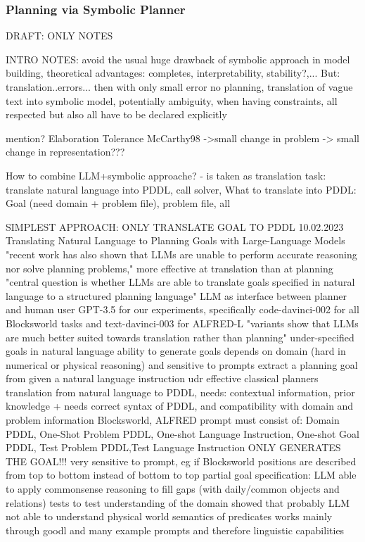 \documentclass{article}
\begin{document}
\subsubsection{Planning via Symbolic Planner}
DRAFT: ONLY NOTES

INTRO NOTES: 
avoid the usual huge drawback of symbolic approach in model building, 
theoretical advantages: completes, interpretability, stability?,...
But: translation..errors... then with only small error no planning, translation of vague text into symbolic model, potentially ambiguity, 
when having constraints, all respected but also all have to be declared explicitly

mention? Elaboration Tolerance McCarthy98 ->small change in problem -> small change in representation???

How to combine LLM+symbolic approache? -  is taken as translation task: translate natural language into PDDL, call solver, 
What to translate into PDDL: Goal (need domain + problem file), problem file, all

SIMPLEST APPROACH: ONLY TRANSLATE GOAL TO PDDL
\cite{xie_translating_2023} 10.02.2023 Translating Natural Language to Planning Goals with Large-Language Models
"recent work has also shown that LLMs are unable to perform accurate reasoning nor solve planning problems,"
more effective at translation than at planning
"central question is whether LLMs are able to translate goals specified in natural language to a structured planning language"
LLM as interface between planner and human user
GPT-3.5 for our experiments, specifically code-davinci-002 for all Blocksworld tasks and text-davinci-003 for ALFRED-L
"variants show that LLMs are much better suited towards translation rather than planning"
under-specified goals in natural language
ability to generate goals depends on domain (hard in numerical or physical reasoning) and sensitive to prompts
extract a planning goal from given a natural language instruction
udr effective classical planners
translation from natural language to PDDL, needs: contextual information, prior knowledge
+ needs correct syntax of PDDL, and compatibility with domain and problem information
Blocksworld, ALFRED
prompt must consist of: Domain PDDL, One-Shot Problem PDDL, One-shot Language Instruction, One-shot Goal PDDL, Test Problem PDDL,Test Language Instruction
ONLY GENERATES THE GOAL!!!
very sensitive to prompt, eg if Blocksworld positions are described from top to bottom instead of bottom to top 
partial goal specification: LLM able to apply commonsense reasoning to fill gaps (with daily/common objects and relations)
tests to test understanding of the domain showed that probably LLM not able to understand physical world semantics of predicates
works mainly through goodl and many example prompts and therefore linguistic capabilities
\end{document}
